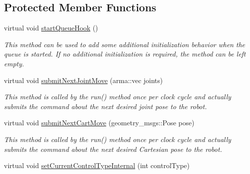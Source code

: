\subsection*{Protected Member Functions}
\begin{DoxyCompactItemize}
\item 
\hypertarget{classkukadu_1_1PlottingControlQueue_ae43df8bbe8df49fc3a20a134f0cb84c2}{virtual void \hyperlink{classkukadu_1_1PlottingControlQueue_ae43df8bbe8df49fc3a20a134f0cb84c2}{start\-Queue\-Hook} ()}\label{classkukadu_1_1PlottingControlQueue_ae43df8bbe8df49fc3a20a134f0cb84c2}

\begin{DoxyCompactList}\small\item\em This method can be used to add some additional initialization behavior when the queue is started. If no additional initialization is required, the method can be left empty. \end{DoxyCompactList}\item 
\hypertarget{classkukadu_1_1PlottingControlQueue_abcdd49af491df3aed56aada370df1b78}{virtual void \hyperlink{classkukadu_1_1PlottingControlQueue_abcdd49af491df3aed56aada370df1b78}{submit\-Next\-Joint\-Move} (arma\-::vec joints)}\label{classkukadu_1_1PlottingControlQueue_abcdd49af491df3aed56aada370df1b78}

\begin{DoxyCompactList}\small\item\em This method is called by the run() method once per clock cycle and actually submits the command about the next desired joint pose to the robot. \end{DoxyCompactList}\item 
\hypertarget{classkukadu_1_1PlottingControlQueue_a3447e691e812c0ca8390a05c00fe6621}{virtual void \hyperlink{classkukadu_1_1PlottingControlQueue_a3447e691e812c0ca8390a05c00fe6621}{submit\-Next\-Cart\-Move} (geometry\-\_\-msgs\-::\-Pose pose)}\label{classkukadu_1_1PlottingControlQueue_a3447e691e812c0ca8390a05c00fe6621}

\begin{DoxyCompactList}\small\item\em This method is called by the run() method once per clock cycle and actually submits the command about the next desired Cartesian pose to the robot. \end{DoxyCompactList}\item 
\hypertarget{classkukadu_1_1PlottingControlQueue_ad57f6b029d1acd9160702973b74c87de}{virtual void \hyperlink{classkukadu_1_1PlottingControlQueue_ad57f6b029d1acd9160702973b74c87de}{set\-Current\-Control\-Type\-Internal} (int control\-Type)}\label{classkukadu_1_1PlottingControlQueue_ad57f6b029d1acd9160702973b74c87de}


\end{DoxyCompactItemize}
